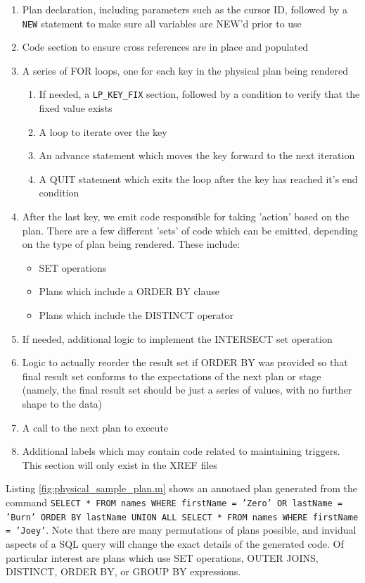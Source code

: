 \documentclass[]{article}
\def\code#1{\texttt{#1}}
\begin{document}
\begin{enumerate}
	\item Plan declaration, including parameters such as the cursor ID, followed by a \code{NEW} statement to make sure all variables are NEW'd prior to use
	\item Code section to ensure cross references are in place and populated
	\item A series of FOR loops, one for each key in the physical plan being rendered
	\begin{enumerate}
		\item If needed, a \code{LP\_KEY\_FIX} section, followed by a condition to verify that the fixed value exists
		\item A loop to iterate over the key
		\item An advance statement which moves the key forward to the next iteration
		\item A QUIT statement which exits the loop after the key has reached it's end condition 
	\end{enumerate}
	\item After the last key, we emit code responsible for taking 'action' based on the plan. There are a few different 'sets' of code which can be emitted, depending on the type of plan being rendered. These include:
	\begin{itemize}
		\item SET operations
		\item Plans which include a ORDER BY clause
		\item Plans which include the DISTINCT operator
	\end{itemize}
	\item If needed, additional logic to implement the INTERSECT set operation
	\item Logic to actually reorder the result set if ORDER BY was provided so that final result set conforms to the expectations of the next plan or stage (namely, the final result set should be just a series of values, with no further shape to the data)
	\item A call to the next plan to execute
	\item Additional labels which may contain code related to maintaining triggers. This section will only exist in the XREF files
\end{enumerate}

Listing \ref{fig:physical_sample_plan.m} shows an annotaed plan generated from the command \code{SELECT * FROM names WHERE firstName = 'Zero' OR lastName = 'Burn' ORDER BY lastName UNION ALL SELECT * FROM names WHERE firstName = 'Joey'}.
Note that there are many permutations of plans possible, and invidual aspects of a SQL query will change the exact details of the generated code.
Of particular interest are plans which use SET operations, OUTER JOINS, DISTINCT, ORDER BY, or GROUP BY expressions.
\end{document}
